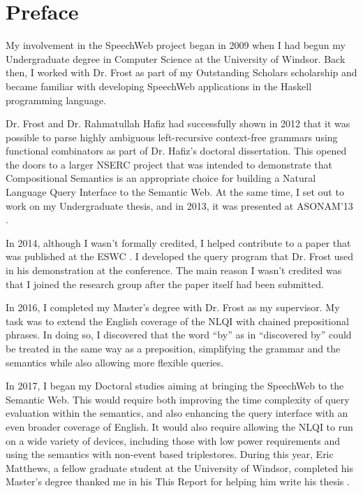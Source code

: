 \documentclass[../main.tex]{subfiles}
\begin{document}
\chapter{Preface}
\begin{refsection}
    My involvement in the SpeechWeb project began in 2009 when I had begun my Undergraduate
    degree in Computer Science at the University of Windsor.  Back then, I worked with Dr. Frost as part of my Outstanding Scholars scholarship and became familiar with developing SpeechWeb applications in the Haskell programming language.

    Dr. Frost and Dr. Rahmatullah Hafiz had successfully shown in 2012 that it was possible to parse highly ambiguous left-recursive context-free grammars using functional combinators as part of Dr. Hafiz's doctoral dissertation. This opened the doors to a larger NSERC project
    that was intended to demonstrate that Compositional Semantics is an appropriate choice
    for building a Natural Language Query Interface to the Semantic Web.  At the same time, I set out
    to work on my Undergraduate thesis, and in 2013, it was presented at ASONAM'13 \cite{donais2013system}.

    In 2014, although I wasn't formally credited, I helped contribute to a paper that was published at the ESWC \cite{frost2014demonstration}.  I developed the query program that Dr. Frost used in his demonstration at the conference.  The main reason I wasn't credited was that I joined the research group after the paper itself had been submitted.

    In 2016, I completed my Master's degree with Dr. Frost as my supervisor.  My task was to extend the English coverage of the NLQI with chained prepositional phrases.  In doing so, I discovered that the word ``by'' as in ``discovered by'' could be treated in the same way as a preposition, simplifying the grammar and the semantics while also allowing more flexible queries.

    In 2017, I began my Doctoral studies aiming at bringing the SpeechWeb to the Semantic Web.
    This would require both improving the time complexity of query evaluation within the semantics, and also enhancing the query interface with an even broader coverage of English.  It would also require allowing the NLQI to run on a wide variety of devices, including those with low power requirements and using the semantics with non-event based triplestores.  During this year, Eric Matthews, a fellow graduate student at the University of Windsor, completed his Master's degree thanked me in his This Report for helping him write his thesis \cite{matthews2017passive}.


\end{refsection}
\end{document}
